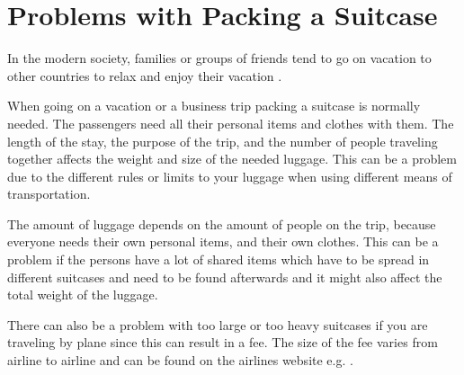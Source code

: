 \section{Problems with Packing a Suitcase}
In the modern society, families or groups of friends tend to go on vacation to other countries to relax and enjoy their vacation \citep{danskecharter}.

When going on a vacation or a business trip packing a suitcase is normally needed. The passengers need all their personal items and clothes with them. The length of the stay, the purpose of the trip, and the number of people traveling together affects the weight and size of the needed luggage. This can be a problem due to the different rules or limits to your luggage when using different means of transportation.

 

The amount of luggage depends on the amount of people on the trip, because everyone needs their own personal items, and their own clothes. This can be a problem if the persons have a lot of shared items which have to be spread in different suitcases and need to be found afterwards and it might also affect the total weight of the luggage.

 
There can also be a problem with too large or too heavy suitcases if you are traveling by plane since this can result in a fee. The size of the fee varies from airline to airline and can be found on the airlines website e.g.  \citep{altombag}. 

